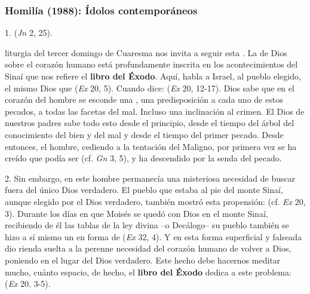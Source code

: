 \newpage
\subsubsection{Homilía (1988): Ídolos contemporáneos}


\begin{body}
1.  (\textit{Jn} 2, 25).

 liturgia del tercer domingo de Cuaresma nos invita a seguir esta . La  de Dios sobre el corazón humano está profundamente inscrita en los acontecimientos del Sinaí que nos refiere el \textbf{libro del Éxodo}. Aquí, habla a Israel, al pueblo elegido, el mismo Dios que  (\textit{Ex} 20, 5). Cuando dice:  (\textit{Ex} 20, 12-17). Dios sabe que en el corazón del hombre se esconde una , una predisposición a cada uno de estos pecados, a todas las facetas del mal. Incluso una inclinación al crimen. El Dios de nuestros padres sabe todo esto desde el principio, desde el tiempo del árbol del conocimiento del bien y del mal y desde el tiempo del primer pecado. Desde entonces, el hombre, cediendo a la tentación del Maligno, por primera vez se ha creído que podía ser  (cf. \textit{Gn} 3, 5), y ha descendido por la senda del pecado.

2. Sin embargo, en este hombre permanecía una misteriosa necesidad de buscar  fuera del único Dios verdadero. El pueblo que estaba al pie del monte Sinaí, aunque elegido por el Dios verdadero, también mostró esta propensión:  (cf. \textit{Ex} 20, 3). Durante los días en que Moisés se quedó con Dios en el monte Sinaí, recibiendo de él las tablas de la ley divina –o Decálogo– su pueblo también se hizo a sí mismo un  en forma de  (\textit{Ex} 32, 4). Y en esta forma superficial y falseada dio rienda suelta a la perenne necesidad del corazón humano de volver a Dios, poniendo  en el lugar del Dios verdadero. Este hecho debe hacernos meditar mucho, cuánto espacio, de hecho, el \textbf{libro del Éxodo} dedica a este problema:  (\textit{Ex} 20, 3-5).


\end{body}

